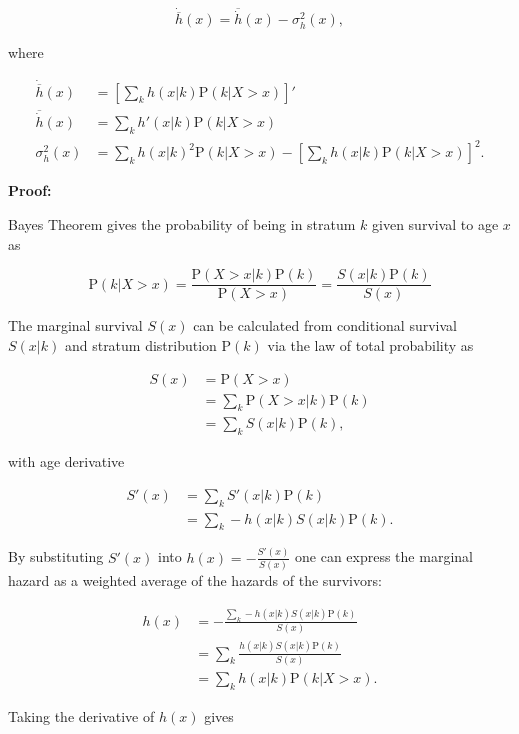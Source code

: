 \documentclass[10pt,twoside,reqno]{article}
\begin{document}
  \[
  \dot{\overline{h}}(x) = \overline{\dot{h}}(x) - \sigma_h^2(x),
  \]

  where

  \[
  \begin{aligned}
    \dot{\overline{h}}(x) &= \left[\sum_k h(x|k)\mathrm{P}(k|X>x)\right]' \\
    \overline{\dot{h}}(x) &= \sum_k h'(x|k)\mathrm{P}(k|X>x) \\
    \sigma_h^2(x) &=
      \sum_k h(x|k)^2 \mathrm{P}(k|X>x) -
      \left[\sum_k h(x|k)\mathrm{P}(k|X>x)\right]^2.
  \end{aligned}
  \]

  \textbf{Proof:}

  Bayes Theorem gives the probability of being in stratum \(k\) given survival to age \(x\) as

  \[
  \mathrm{P}(k|X>x) = \frac{\mathrm{P}(X>x|k)\mathrm{P}(k)} {\mathrm{P}(X>x)} =     \frac{S(x|k)\mathrm{P}(k)}{S(x)}
  \]

  The marginal survival \(S(x)\) can be calculated from conditional survival \(S(x|k)\) and stratum distribution \(\mathrm{P}(k)\) via the law of total probability as

  \[
  \begin{aligned}
  S(x) &= \mathrm{P}(X>x) \\
  &= \sum_k \mathrm{P}(X>x|k)\mathrm{P}(k) \\
  &= \sum_kS(x|k)\mathrm{P}(k),
  \end{aligned}
  \]

  with age derivative

  \[
  \begin{aligned}
    S'(x) &= \sum_k S'(x|k)\mathrm{P}(k) \\
          &= \sum_k -h(x|k)S(x|k)\mathrm{P}(k).
  \end{aligned}
  \]

  By substituting \(S'(x)\) into \(h(x)=-\frac{S'(x)}{S(x)}\) one can express the marginal hazard as a weighted average of the hazards of the survivors:

  \[
  \begin{aligned}
    h(x) &= -\frac{\sum_k -h(x|k)S(x|k)\mathrm{P}(k)} {S(x)} \\
         &= \sum_k \frac{h(x|k)S(x|k)\mathrm{P}(k)} {S(x)} \\
         &= \sum_k h(x|k)\mathrm{P}(k|X>x).
  \end{aligned}
  \]

  Taking the derivative of \(h(x)\) gives
\end{document}
